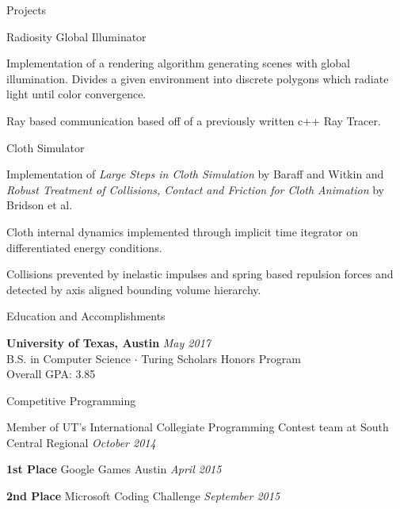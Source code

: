 \documentclass{resume} %
\begin{document}
\begin{rSection}{Projects}

  \begin{rSubsection}{Radiosity Global Illuminator}{}{}{}
  \item Implementation of a rendering algorithm generating scenes with global illumination. Divides a given environment into discrete polygons which radiate light until color convergence. 
  \item Ray based communication based off of a previously written c++ Ray Tracer.
  \end{rSubsection}

  \begin{rSubsection}{Cloth Simulator}{}{}{}
  \item Implementation of \textit{Large Steps in Cloth Simulation} by Baraff and Witkin and \textit{Robust Treatment of Collisions, Contact and Friction for Cloth Animation} by Bridson et al. 
  \item Cloth internal dynamics implemented through implicit time itegrator on differentiated energy conditions. 
  \item Collisions prevented by inelastic impulses and spring based repulsion forces and detected by axis aligned bounding volume hierarchy.
  \end{rSubsection}

\end{rSection}


\begin{rSection}{Education and Accomplishments}

  {\bf University of Texas, Austin} \hfill {\em May 2017} \\ 
  B.S. in Computer Science $\cdot$ Turing Scholars Honors Program  \\
  Overall GPA: 3.85

\begin{rSubsection}{Competitive Programming}{}{}{}
\item Member of UT's International Collegiate Programming Contest team at South Central Regional \hfill {\em October 2014}
\item {\bf 1st Place} Google Games Austin \hfill {\em April 2015}
\item {\bf 2nd Place} Microsoft Coding Challenge \hfill {\em September 2015}
\end{rSubsection}

\end{rSection}
\end{document}
